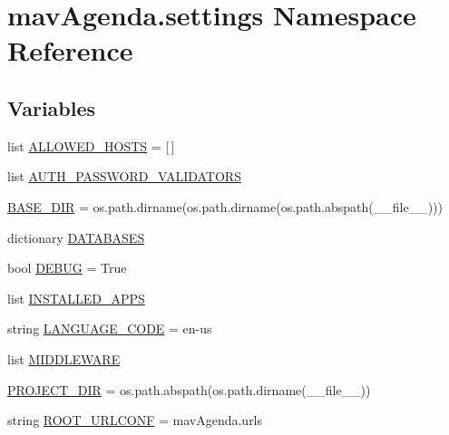 \hypertarget{namespacemavAgenda_1_1settings}{}\section{mav\+Agenda.\+settings Namespace Reference}
\label{namespacemavAgenda_1_1settings}
\subsection*{Variables}
\begin{DoxyCompactItemize}
\item 
list \mbox{\hyperlink{namespacemavAgenda_1_1settings_a4610b713f82b38669b6a415cb65fcf99}{A\+L\+L\+O\+W\+E\+D\+\_\+\+H\+O\+S\+TS}} = \mbox{[}$\,$\mbox{]}
\item 
list \mbox{\hyperlink{namespacemavAgenda_1_1settings_a168b84f6e963453be6cd21c6135b5d28}{A\+U\+T\+H\+\_\+\+P\+A\+S\+S\+W\+O\+R\+D\+\_\+\+V\+A\+L\+I\+D\+A\+T\+O\+RS}}
\item 
\mbox{\hyperlink{namespacemavAgenda_1_1settings_a4c1c25aebe0c84efbeb882ae68410153}{B\+A\+S\+E\+\_\+\+D\+IR}} = os.\+path.\+dirname(os.\+path.\+dirname(os.\+path.\+abspath(\+\_\+\+\_\+file\+\_\+\+\_\+)))
\item 
dictionary \mbox{\hyperlink{namespacemavAgenda_1_1settings_a90bba01c6fcb83baced6119ef2086795}{D\+A\+T\+A\+B\+A\+S\+ES}}
\item 
bool \mbox{\hyperlink{namespacemavAgenda_1_1settings_aaa092728fcb45002a379980f9bf58b0b}{D\+E\+B\+UG}} = True
\item 
list \mbox{\hyperlink{namespacemavAgenda_1_1settings_a8dd26f1a92700761e22c785c57781d4c}{I\+N\+S\+T\+A\+L\+L\+E\+D\+\_\+\+A\+P\+PS}}
\item 
string \mbox{\hyperlink{namespacemavAgenda_1_1settings_ab80769734fc5d1e7b02e6e7796463770}{L\+A\+N\+G\+U\+A\+G\+E\+\_\+\+C\+O\+DE}} = \textquotesingle{}en-\/us\textquotesingle{}
\item 
list \mbox{\hyperlink{namespacemavAgenda_1_1settings_a5c0140137432ceb328494a9284398f75}{M\+I\+D\+D\+L\+E\+W\+A\+RE}}
\item 
\mbox{\hyperlink{namespacemavAgenda_1_1settings_ab4ce42a5401340f89c8d454623c34d5e}{P\+R\+O\+J\+E\+C\+T\+\_\+\+D\+IR}} = os.\+path.\+abspath(os.\+path.\+dirname(\+\_\+\+\_\+file\+\_\+\+\_\+))
\item 
string \mbox{\hyperlink{namespacemavAgenda_1_1settings_ae5a898fc55f1f73439d8deb40b39143b}{R\+O\+O\+T\+\_\+\+U\+R\+L\+C\+O\+NF}} = \textquotesingle{}mav\+Agenda.\+urls\textquotesingle{}

\end{DoxyCompactItemize}
